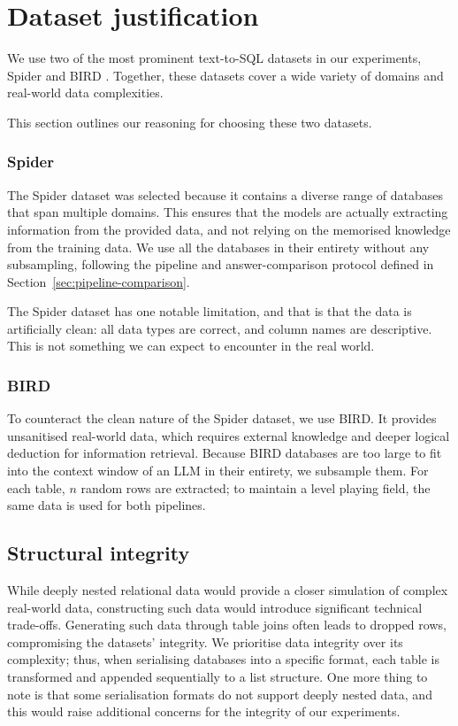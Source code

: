 \section{Dataset justification}

We use two of the most prominent text-to-SQL datasets in our experiments, Spider \cite{yu2018spider} and BIRD
\cite{li2023can}. Together, these datasets cover a wide variety of domains and real-world data complexities.

This section outlines our reasoning for choosing these two datasets.

\subsubsection{Spider} The Spider dataset was selected because it contains a diverse range of databases that
span multiple domains. This ensures that the models are actually extracting information from the provided
data, and not relying on the memorised knowledge from the training data. We use all the databases in their
entirety without any subsampling, following the pipeline and answer-comparison protocol defined in
Section~\ref{sec:pipeline-comparison}.

The Spider dataset has one notable limitation, and that is that the data is artificially clean: all data
types are correct, and column names are descriptive. This is not something we can expect to encounter in the real world.

\subsubsection{BIRD}

To counteract the clean nature of the Spider dataset, we use BIRD. It provides unsanitised real-world
data, which requires external knowledge and deeper logical deduction for information retrieval. Because BIRD
databases are too large to fit into the context window of an LLM in their entirety, we subsample them. For
each table, $n$ random rows are extracted; to maintain a level playing field, the same data is used for both pipelines.

\subsection{Structural integrity} While deeply nested relational data would provide a closer simulation of
complex real-world data, constructing such data would introduce significant technical trade-offs. Generating
such data through table joins often leads to dropped rows, compromising the datasets’ integrity. We prioritise
data integrity over its complexity; thus, when serialising databases into a specific format, each table is
transformed and appended sequentially to a list structure. One more thing to note is that some serialisation
formats do not support deeply nested data, and this would raise additional concerns for the integrity of our
experiments.

